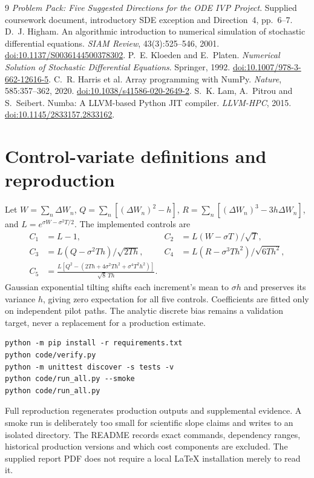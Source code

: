\documentclass[11pt,a4paper]{article}
\begin{document}
\begin{thebibliography}{9}
 \emph{Problem Pack: Five Suggested Directions for the ODE IVP Project}. Supplied coursework document, introductory SDE exception and Direction~4, pp.~6--7.
 D.~J. Higham. An algorithmic introduction to numerical simulation of stochastic differential equations. \emph{SIAM Review}, 43(3):525--546, 2001. \href{https://doi.org/10.1137/S0036144500378302}{doi:10.1137/S0036144500378302}.
 P.~E. Kloeden and E.~Platen. \emph{Numerical Solution of Stochastic Differential Equations}. Springer, 1992. \href{https://doi.org/10.1007/978-3-662-12616-5}{doi:10.1007/978-3-662-12616-5}.
 C.~R. Harris et al. Array programming with NumPy. \emph{Nature}, 585:357--362, 2020. \href{https://doi.org/10.1038/s41586-020-2649-2}{doi:10.1038/s41586-020-2649-2}.
 S.~K. Lam, A.~Pitrou and S.~Seibert. Numba: A LLVM-based Python JIT compiler. \emph{LLVM-HPC}, 2015. \href{https://doi.org/10.1145/2833157.2833162}{doi:10.1145/2833157.2833162}.
\end{thebibliography}
\newpage
\appendix


\newpage
\section{Control-variate definitions and reproduction}\label{app:controls}
Let $W=\sum_n\Delta W_n$, $Q=\sum_n[(\Delta W_n)^2-h]$,
$R=\sum_n[(\Delta W_n)^3-3h\Delta W_n]$, and $L=e^{\sigma W-\sigma^2T/2}$. The implemented controls are
\begin{equation}\label{eq:controls}
\begin{aligned}
C_1&=L-1,& C_2&=L(W-\sigma T)/\sqrt T,\\
C_3&=L(Q-\sigma^2Th)/\sqrt{2Th},& C_4&=L(R-\sigma^3Th^2)/\sqrt{6Th^2},\\
C_5&=\frac{L[Q^2-(2Th+4\sigma^2Th^2+\sigma^4T^2h^2)]}{\sqrt8\,Th}.
\end{aligned}
\end{equation}
Gaussian exponential tilting shifts each increment's mean to $\sigma h$ and preserves its variance $h$, giving zero expectation for all five controls. Coefficients are fitted only on independent pilot paths. The analytic discrete bias remains a validation target, never a replacement for a production estimate.
\begin{lstlisting}[numbers=none,caption={Commands from the extracted code archive's top-level directory.}]
python -m pip install -r requirements.txt
python code/verify.py
python -m unittest discover -s tests -v
python code/run_all.py --smoke
python code/run_all.py
\end{lstlisting}
Full reproduction regenerates production outputs and supplemental evidence. A smoke run is deliberately too small for scientific slope claims and writes to an isolated directory. The README records exact commands, dependency ranges, historical production versions and which cost components are excluded. The supplied report PDF does not require a local LaTeX installation merely to read it.
\end{document}
